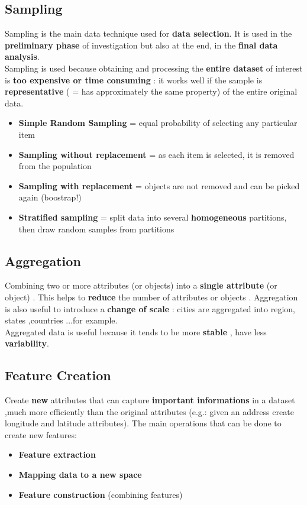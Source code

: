 \subsection{Sampling}
Sampling is the main data technique used for \textbf{data selection}. It is used in the \textbf{preliminary phase} of investigation but also at the end, in the \textbf{final data analysis}.\\
Sampling is used because obtaining and processing the \textbf{entire dataset} of interest is \textbf{too expensive or time consuming} : it works well if the sample is \textbf{representative} ( = has approximately the same property) of the entire original data.
\begin{itemize}
\item \textbf{Simple Random Sampling} = equal probability of selecting any particular item
\item \textbf{Sampling without replacement} = as each item is selected, it is removed from the population
\item \textbf{Sampling with replacement} = objects are not removed and can be picked again (boostrap!)
\item \textbf{Stratified sampling} = split data into several \textbf{homogeneous} partitions, then draw random samples from partitions
\end{itemize}

\subsection{Aggregation}
Combining two or more attributes (or objects) into a \textbf{single attribute} (or object) . This helps to \textbf{reduce} the number of attributes or objects . Aggregation is also useful to introduce a \textbf{change of scale} : cities are aggregated into region, states ,countries ...for example.\\
Aggregated data is useful because it tends to be more \textbf{stable} , have less \textbf{variability}.

\subsection{Feature Creation}
Create \textbf{new } attributes that can capture \textbf{important informations} in a dataset ,much more efficiently than the original attributes (e.g.: given an address create longitude and latitude attributes).
The main operations that can be done to create new features:
\begin{itemize}
\item \textbf{Feature extraction}
\item \textbf{Mapping data to a new space}
\item \textbf{Feature construction} (combining features)
\end{itemize}

